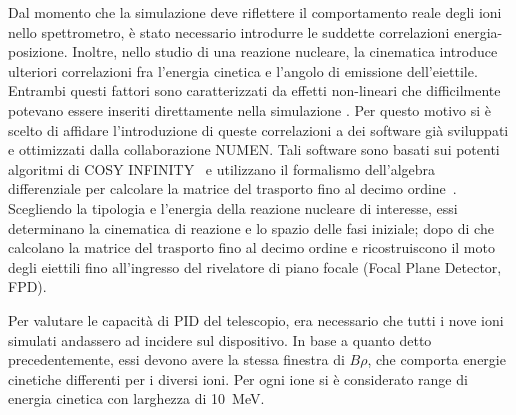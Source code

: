 Dal momento che la simulazione deve riflettere il comportamento reale degli ioni nello spettrometro, è stato necessario introdurre le suddette correlazioni energia-posizione. 
Inoltre, nello studio di una reazione nucleare, la cinematica introduce ulteriori correlazioni fra l'energia cinetica e l'angolo di emissione dell'eiettile.
Entrambi questi fattori sono caratterizzati da effetti non-lineari che difficilmente potevano essere inseriti direttamente nella simulazione \geant. 
Per questo motivo si è scelto di affidare l'introduzione di queste correlazioni a dei software già sviluppati e ottimizzati dalla collaborazione NUMEN.
Tali software sono basati sui potenti algoritmi di COSY INFINITY~\cite{makino:nima99} e utilizzano il formalismo dell'algebra differenziale per calcolare la matrice del trasporto fino al decimo ordine~\cite{cappuzzello:epja16}.
Scegliendo la tipologia e l'energia della reazione nucleare di interesse, essi determinano la cinematica di reazione e lo spazio delle fasi iniziale; dopo di che calcolano la matrice del trasporto fino al decimo ordine e ricostruiscono il moto degli eiettili fino all'ingresso del rivelatore di piano focale (Focal Plane Detector, FPD).



Per valutare le capacità di PID del telescopio, era necessario che tutti i nove ioni simulati andassero ad incidere sul dispositivo. 
In base a quanto detto precedentemente, essi devono avere la stessa finestra di $B \rho$, che comporta energie cinetiche differenti per i diversi ioni. 
Per ogni ione si è considerato range di energia cinetica con larghezza di 10~MeV.



